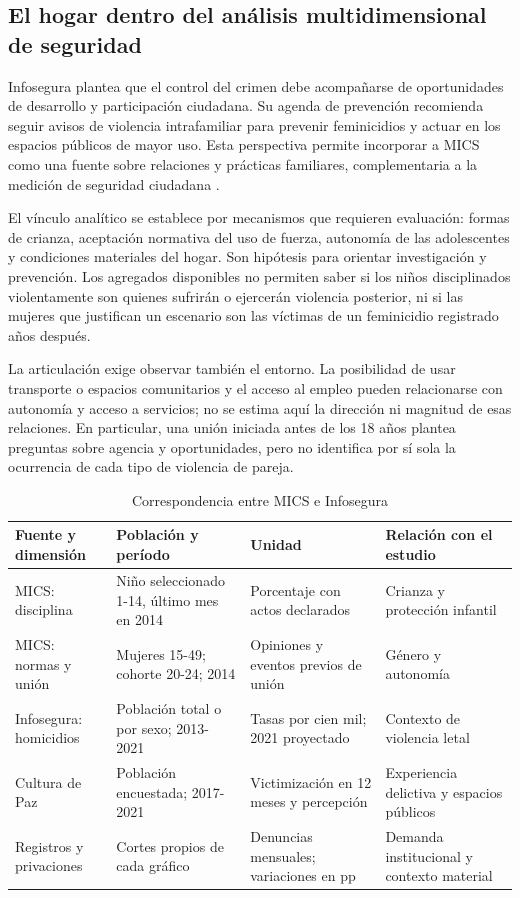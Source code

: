 \subsection{El hogar dentro del análisis multidimensional de seguridad}
Infosegura plantea que el control del crimen debe acompañarse de oportunidades
de desarrollo y participación ciudadana. Su agenda de prevención recomienda seguir
avisos de violencia intrafamiliar para prevenir feminicidios y actuar en los
espacios públicos de mayor uso. Esta perspectiva permite incorporar a MICS
como una fuente sobre relaciones y prácticas familiares, complementaria a
la medición de seguridad ciudadana \citep{infosegura2021}.

El vínculo analítico se establece por mecanismos que requieren evaluación:
formas de crianza, aceptación normativa del uso de fuerza, autonomía de las
adolescentes y condiciones materiales del hogar. Son hipótesis para orientar
investigación y prevención. Los agregados disponibles no permiten saber si
los niños disciplinados violentamente son quienes sufrirán o ejercerán
violencia posterior, ni si las mujeres que justifican un escenario son las
víctimas de un feminicidio registrado años después.

La articulación exige observar también el entorno. La posibilidad de usar
transporte o espacios comunitarios y el acceso al empleo pueden relacionarse
con autonomía y acceso a servicios; no se estima aquí la dirección ni magnitud
de esas relaciones. En particular, una unión iniciada antes de los 18 años
plantea preguntas sobre agencia y oportunidades, pero no identifica por sí
sola la ocurrencia de cada tipo de violencia de pareja.

\begin{table}[htbp]
\centering\small
\caption{Correspondencia entre MICS e Infosegura}\label{tab:comparabilidad}
\begin{tabularx}{\textwidth}{@{}p{2.5cm}YYp{3.4cm}@{}}\toprule
Fuente y dimensión & Población y período & Unidad & Relación con el estudio\\\midrule
MICS: disciplina & Niño seleccionado 1-14, último mes en 2014 & Porcentaje con actos declarados & Crianza y protección infantil\\
MICS: normas y unión & Mujeres 15-49; cohorte 20-24; 2014 & Opiniones y eventos previos de unión & Género y autonomía\\
Infosegura: homicidios & Población total o por sexo; 2013-2021 & Tasas por cien mil; 2021 proyectado & Contexto de violencia letal\\
Cultura de Paz & Población encuestada; 2017-2021 & Victimización en 12 meses y percepción & Experiencia delictiva y espacios públicos\\
Registros y privaciones & Cortes propios de cada gráfico & Denuncias mensuales; variaciones en pp & Demanda institucional y contexto material\\\bottomrule
\end{tabularx}
\end{table}
